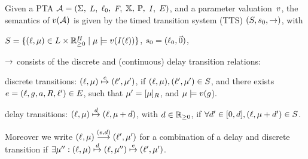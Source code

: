 \begin{tikzborder}{\cite{Gargantini16:validation}}
\begin{tikzborder}{\cite{gargantini_combinatorial_2017}}
\begin{tikzborder}{\cite{garn2019}}
\begin{tikzborder}{\cite{arcaini2019achieving}}
\begin{tikzborder}{\cite{arcaini2019varivolution}}
\begin{tikzborder}{}
\begin{definition}
	Given a PTA $\mathcal{A} = (\Sigma,$ $L,$ $\ell_0,$ $F,$ $\mathbb{X},$ $\mathbb{P},$ $I,$ $E)$,
	and a parameter valuation~\(v\),
	the semantics of $v(\mathcal{A})$ is given by the timed transition system (TTS) $(S, s_0, {\rightarrow})$, with
	\begin{compactitem}
		\item $S = \{ (\ell, \mu) \in L \times {\mathbb{R}}_{\geq 0}^H \mid \mu \models v(I(\ell)) \}$, %
		 $s_0 = (\ell_0, \vec{0}) $,
		\item ${\rightarrow}$ consists of the discrete and (continuous) delay transition relations:
		\begin{ienumeration}
			\item discrete transitions: $(\ell,\mu) \stackrel{e}{\mapsto} (\ell',\mu')$, %
			if $(\ell, \mu) , (\ell',\mu') \in S$, and there exists $e = (\ell,g,a,R,\ell') \in E$, such that $\mu'= [\mu]_{R}$, and $\mu\models v(g$).
			\item delay transitions: $(\ell,\mu) \stackrel{d}{\mapsto} (\ell, \mu+d)$, with $d \in {\mathbb{R}}_{\geq 0}$, if $\forall d' \in [0, d], (\ell, \mu+d') \in S$.
		\end{ienumeration}
	\end{compactitem}
\end{definition}

Moreover we write $(\ell, \mu)\stackrel{(e, d)}{\longrightarrow} (\ell',\mu')$ for a combination of a delay and discrete transition if
$\exists \mu'' : (\ell,\mu) \stackrel{d}{\mapsto} (\ell,\mu'') \stackrel{e}{\mapsto} (\ell',\mu')$.


\end{tikzborder}
\end{tikzborder}
\end{tikzborder}
\end{tikzborder}
\end{tikzborder}
\end{tikzborder}
